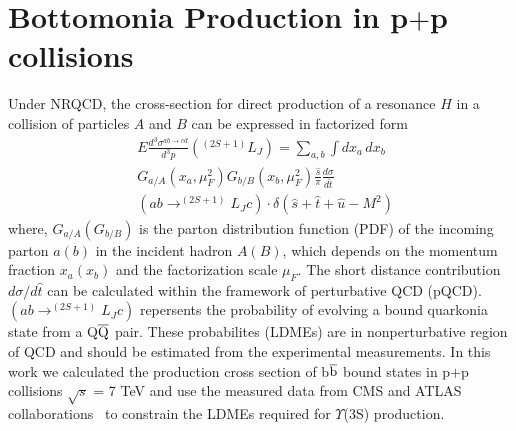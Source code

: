 \documentclass[twocolumn,amsmath,amssymb]{snp}
\begin{document}
\section*{Bottomonia Production in p$+$p collisions}
Under NRQCD, the cross-section for direct production of a resonance $H$ in 
a collision of particles $A$ and $B$ can be expressed in factorized form 
\begin{equation}
  \begin{split}
    &E\frac{d^{3}\sigma^{ab\rightarrow cd}}{d^{3}p}(^{(2S+1)}L_{J}) = \sum_{a,b}\int dx_a\,dx_b \\
    &G_{a/A}(x_a,\mu_{F}^{2}) G_{b/B}(x_b,\mu_{F}^{2})\frac{\hat s}{\pi}\frac{d\sigma}{d\hat t}\\
    &(ab\rightarrow^{(2S+1)}L_{J}c)\cdot \delta(\hat s + \hat t + \hat u -M^{2}) \nonumber
\end{split}
\end{equation}
where, $G_{a/A}(G_{b/B})$ is the parton distribution function (PDF) of the incoming parton $a(b)$ in the 
incident hadron $A(B)$, which depends on the momentum fraction $x_a(x_b)$ and the factorization 
scale $\mu_F$. The short distance contribution $d\sigma/d\hat t$ can be calculated 
within the framework of perturbative QCD (pQCD). $(ab\rightarrow^{(2S+1)}L_{J}c)$ 
repersents the probability of evolving a bound quarkonia state from a Q$\overline{\rm Q}$
pair. These probabilites (LDMEs) are in nonperturbative region of QCD and should 
be estimated from the experimental measurements. 
In this work we calculated the production cross section of b$\overline{\rm b}$ bound states 
in p$+$p collisions $\sqrt{s}$ = 7 TeV and use the measured data from CMS and ATLAS 
collaborations~\cite{Khachatryan:2015qpa,Aad:2012dlq} to constrain the LDMEs required for
$\Upsilon$(3S) production.
\end{document}
